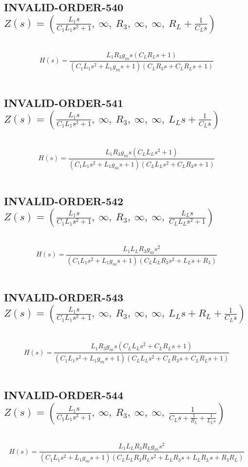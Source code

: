 \documentclass{article}
\begin{document}
\subsection{INVALID-ORDER-540 $Z(s) = \left( \frac{L_{1} s}{C_{1} L_{1} s^{2} + 1}, \  \infty, \  R_{3}, \  \infty, \  \infty, \  R_{L} + \frac{1}{C_{L} s}\right)$ } \ 
\textbf{\[H(s) = \frac{L_{1} R_{3} g_{m} s \left(C_{L} R_{L} s + 1\right)}{\left(C_{1} L_{1} s^{2} + L_{1} g_{m} s + 1\right) \left(C_{L} R_{3} s + C_{L} R_{L} s + 1\right)}\] } \ 
\subsection{INVALID-ORDER-541 $Z(s) = \left( \frac{L_{1} s}{C_{1} L_{1} s^{2} + 1}, \  \infty, \  R_{3}, \  \infty, \  \infty, \  L_{L} s + \frac{1}{C_{L} s}\right)$ } \ 
\textbf{\[H(s) = \frac{L_{1} R_{3} g_{m} s \left(C_{L} L_{L} s^{2} + 1\right)}{\left(C_{1} L_{1} s^{2} + L_{1} g_{m} s + 1\right) \left(C_{L} L_{L} s^{2} + C_{L} R_{3} s + 1\right)}\] } \ 
\subsection{INVALID-ORDER-542 $Z(s) = \left( \frac{L_{1} s}{C_{1} L_{1} s^{2} + 1}, \  \infty, \  R_{3}, \  \infty, \  \infty, \  \frac{L_{L} s}{C_{L} L_{L} s^{2} + 1}\right)$ } \ 
\textbf{\[H(s) = \frac{L_{1} L_{L} R_{3} g_{m} s^{2}}{\left(C_{1} L_{1} s^{2} + L_{1} g_{m} s + 1\right) \left(C_{L} L_{L} R_{3} s^{2} + L_{L} s + R_{3}\right)}\] } \ 
\subsection{INVALID-ORDER-543 $Z(s) = \left( \frac{L_{1} s}{C_{1} L_{1} s^{2} + 1}, \  \infty, \  R_{3}, \  \infty, \  \infty, \  L_{L} s + R_{L} + \frac{1}{C_{L} s}\right)$ } \ 
\textbf{\[H(s) = \frac{L_{1} R_{3} g_{m} s \left(C_{L} L_{L} s^{2} + C_{L} R_{L} s + 1\right)}{\left(C_{1} L_{1} s^{2} + L_{1} g_{m} s + 1\right) \left(C_{L} L_{L} s^{2} + C_{L} R_{3} s + C_{L} R_{L} s + 1\right)}\] } \ 
\subsection{INVALID-ORDER-544 $Z(s) = \left( \frac{L_{1} s}{C_{1} L_{1} s^{2} + 1}, \  \infty, \  R_{3}, \  \infty, \  \infty, \  \frac{1}{C_{L} s + \frac{1}{R_{L}} + \frac{1}{L_{L} s}}\right)$ } \ 
\textbf{\[H(s) = \frac{L_{1} L_{L} R_{3} R_{L} g_{m} s^{2}}{\left(C_{1} L_{1} s^{2} + L_{1} g_{m} s + 1\right) \left(C_{L} L_{L} R_{3} R_{L} s^{2} + L_{L} R_{3} s + L_{L} R_{L} s + R_{3} R_{L}\right)}\] } \ 
\end{document}
